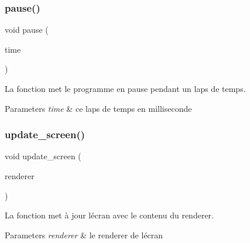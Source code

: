 \subsubsection{\texorpdfstring{pause()}{pause()}}
{\footnotesize\ttfamily void pause (\begin{DoxyParamCaption}\item[{int}]{time }\end{DoxyParamCaption})}



La fonction met le programme en pause pendant un laps de temps. 


\begin{DoxyParams}{Parameters}
{\em time} & ce laps de temps en milliseconde \\
\hline
\end{DoxyParams}
\mbox{\label{sdl2-light_8c_adaf353d9ae01b52dd37cd0adf2d5c9ee}} 
\subsubsection{\texorpdfstring{update\+\_\+screen()}{update\_screen()}}
{\footnotesize\ttfamily void update\+\_\+screen (\begin{DoxyParamCaption}\item[{S\+D\+L\+\_\+\+Renderer $\ast$}]{renderer }\end{DoxyParamCaption})}



La fonction met à jour l\textquotesingle{}écran avec le contenu du renderer. 


\begin{DoxyParams}{Parameters}
{\em renderer} & le renderer de l\textquotesingle{}écran \\
\hline
\end{DoxyParams}
